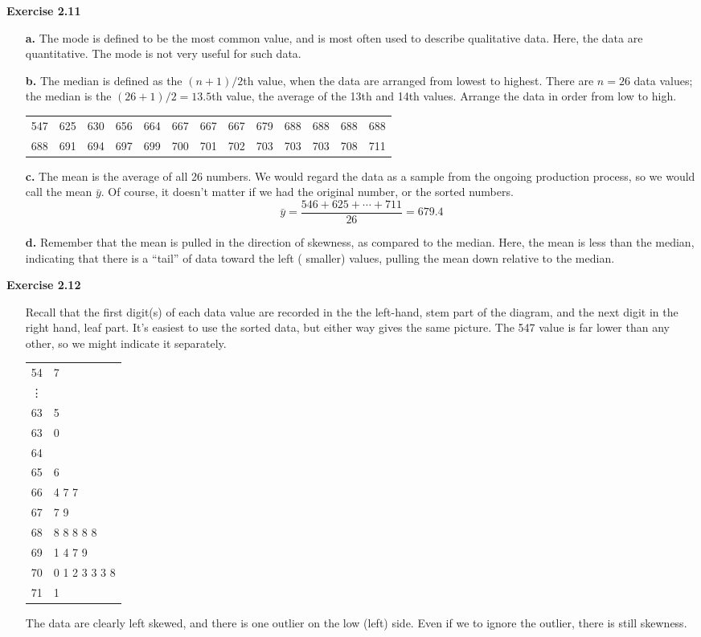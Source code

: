 \documentclass[10pt]{article}
\begin{document}
{\bf Exercise 2.11}
\begin{itemize}
\item[\bf a.] The mode is defined to be the most common value, and 
is most often used to describe qualitative data. Here, the data are 
quantitative. The mode is not very useful for such data.
\item[\bf b.] The median is defined as the $(n+1)/2$th value, when 
the data are arranged from lowest to highest. There are $n=26$ data 
values; the median is the $(26+1)/2=13.5$th value, the average of the 
13th and 14th values. Arrange the data in order from low to high.
\begin{center}
\begin{tabular}{ccccccccccccc}
547&625&630&656&664&667&667&667&679&688&688&688&688\\
688&691&694&697&699&700&701&702&703&703&703&708&711
\end{tabular}
\end{center}
\item[\bf c.] The mean is the average of all 26 numbers. We would 
regard the data as a sample from the ongoing production process, 
so we would call the mean $\bar{y}$. Of course, it doesn't matter 
if we had the original number, or the sorted numbers.
$$\bar{y}=\frac{546+625+\cdots+711}{26}=679.4$$
\item[\bf d.] Remember that the mean is pulled in the direction of 
skewness, as compared to the median. Here, the mean is less than the 
median, indicating that there is a ``tail'' of data toward the left (
smaller) values, pulling the mean down relative to the median.
\end{itemize}

{\bf Exercise 2.12}
\begin{itemize}
\item[\empty] Recall that the first digit(s) of each data value are 
recorded in the the left-hand, stem part of the diagram, and the
next digit in the right hand, leaf part. It's easiest to use the 
sorted data, but either way gives the same picture. The 547 value 
is far lower than any other, so we might indicate it separately.
\begin{center}
\begin{tabular}{r|l}
54&7\\
\vdots&\\
63&5\\
63&0\\
64&\\
65&6\\
66&4 7 7\\
67&7 9\\
68&8 8 8 8 8\\
69&1 4 7 9\\
70&0 1 2 3 3 3 8\\
71&1
\end{tabular}
\end{center}
The data are clearly left skewed, and there is one outlier on the low 
(left) side. Even if we to ignore the outlier, there is still skewness.
\end{itemize}
\end{document}

